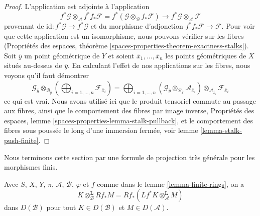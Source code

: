 \begin{proof}
L'application est adjointe à l'application
$$
f^*\mathcal{G} \otimes_\mathcal{A}
f^* f_*\mathcal{F} =
f^*(\mathcal{G} \otimes_\mathcal{B} f_*\mathcal{F})
\longrightarrow
f^*\mathcal{G} \otimes_\mathcal{A} \mathcal{F}
$$
provenant de $\text{id} : f^*\mathcal{G} \to f^*\mathcal{G}$
et du morphisme d'adjonction $f^* f_*\mathcal{F} \to \mathcal{F}$.
Pour voir que cette application est un isomorphisme, nous pouvons vérifier sur les fibres
(Propriétés des espaces, théorème
\ref{spaces-properties-theorem-exactness-stalks}).
Soit $\overline{y}$ un point géométrique de $Y$ et
soient $\overline{x}_1, \ldots, \overline{x}_n$ les points géométriques
de $X$ situés au-dessus de $\overline{y}$.
En calculant l'effet de nos applications sur les fibres, nous voyons qu'il faut
démontrer
$$
\mathcal{G}_{\overline{y}}
\otimes_{\mathcal{B}_{\overline{y}}}
\left(
\bigoplus\nolimits_{i = 1, \ldots, n} \mathcal{F}_{\overline{x}_i}
\right) =
\bigoplus\nolimits_{i = 1, \ldots, n}
(\mathcal{G}_{\overline{y}}
\otimes_{\mathcal{B}_{\overline{x}}}
\mathcal{A}_{\overline{x}_i}) \otimes_{\mathcal{A}_{\overline{x}_i}}
\mathcal{F}_{\overline{x}_i}
$$
ce qui est vrai. Nous avons utilisé ici que
le produit tensoriel commute au passage aux fibres, ainsi que le
comportement des fibres par image inverse,
Propriétés des espaces, lemme \ref{spaces-properties-lemma-stalk-pullback}, et
le comportement des fibres sous poussée le long d'une immersion fermée, voir
lemme \ref{lemma-stalk-push-finite}.
\end{proof}

\noindent
Nous terminons cette section par une formule de projection très générale
pour les morphismes finis.

\begin{lemma}
\label{lemma-projection-formula-finite}
Avec $S$, $X$, $Y$, $\pi$, $\mathcal{A}$, $\mathcal{B}$, $\varphi$ et $f$
comme dans le lemme \ref{lemma-finite-rings}, on a
$$
K \otimes_\mathcal{B}^\mathbf{L} Rf_*M =
Rf_*(Lf^*K \otimes_\mathcal{A}^\mathbf{L} M)
$$
dans $D(\mathcal{B})$ pour tout $K \in D(\mathcal{B})$ et
$M \in D(\mathcal{A})$.
\end{lemma}

